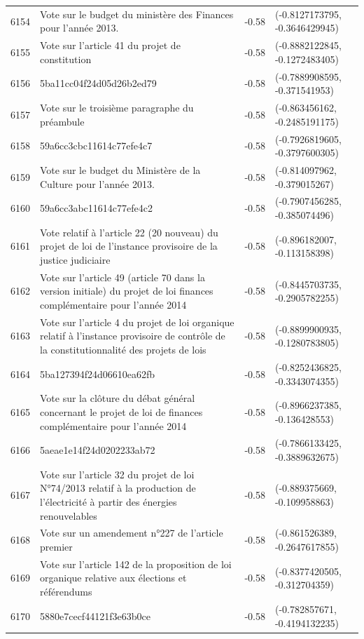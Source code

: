 \begin{table}[ht]
\begin{tabular}{rlrl}
  6154 & Vote sur le budget du ministère des Finances pour l'année 2013. & -0.58 & (-0.8127173795, -0.3646429945) \\ 
  6155 & Vote sur l'article 41 du projet de constitution & -0.58 & (-0.8882122845, -0.1272483405) \\ 
  6156 & 5ba11cc04f24d05d26b2ed79 & -0.58 & (-0.7889908595, -0.371541953) \\ 
  6157 & Vote sur le troisième paragraphe du préambule & -0.58 & (-0.863456162, -0.2485191175) \\ 
  6158 & 59a6cc3cbc11614c77efe4c7 & -0.58 & (-0.7926819605, -0.3797600305) \\ 
  6159 & Vote sur le budget du Ministère de la Culture pour l'année 2013. & -0.58 & (-0.814097962, -0.379015267) \\ 
  6160 & 59a6cc3abc11614c77efe4c2 & -0.58 & (-0.7907456285, -0.385074496) \\ 
  6161 & Vote relatif à l'article 22 (20 nouveau) du projet de loi de l'instance provisoire de la justice judiciaire & -0.58 & (-0.896182007, -0.113158398) \\ 
  6162 & Vote sur l'article 49 (article 70 dans la version initiale) du projet de loi finances complémentaire pour l'année 2014 & -0.58 & (-0.8445703735, -0.2905782255) \\ 
  6163 & Vote sur l'article 4 du projet de loi organique relatif à l'instance provisoire de contrôle de la constitutionnalité des projets de lois & -0.58 & (-0.8899900935, -0.1280783805) \\ 
  6164 & 5ba127394f24d06610ea62fb & -0.58 & (-0.8252436825, -0.3343074355) \\ 
  6165 & Vote sur la clôture du débat général concernant le projet de loi de finances complémentaire pour l'année 2014 & -0.58 & (-0.8966237385, -0.136428553) \\ 
  6166 & 5aeae1e14f24d0202233ab72 & -0.58 & (-0.7866133425, -0.3889632675) \\ 
  6167 & Vote sur l'article 32 du projet de loi N°74/2013 relatif à la production de l'électricité à partir des énergies renouvelables & -0.58 & (-0.889375669, -0.109958863) \\ 
  6168 & Vote sur un amendement n°227 de l'article premier & -0.58 & (-0.861526389, -0.2647617855) \\ 
  6169 & Vote sur l'article 142 de la proposition de loi organique relative aux élections et référendums & -0.58 & (-0.8377420505, -0.312704359) \\ 
  6170 & 5880e7cecf44121f3e63b0ce & -0.58 & (-0.782857671, -0.4194132235) \\ 

\end{tabular}
\end{table}
